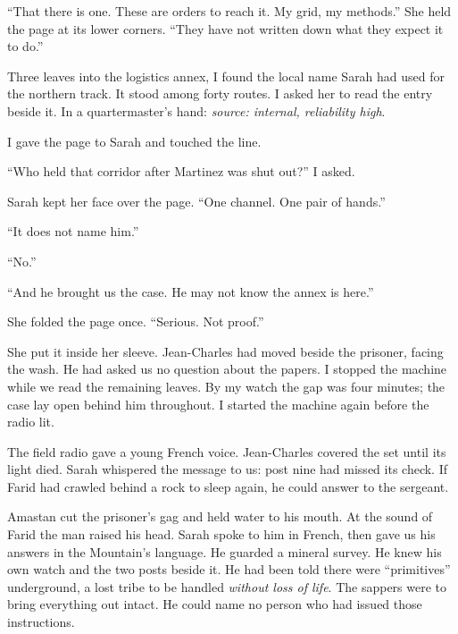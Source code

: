 ``That there is one. These are orders to reach it. My grid, my methods.'' She held the page at its lower corners. ``They have not written down what they expect it to do.''\par

Three leaves into the logistics annex, I found the local name Sarah had used for the northern track. It stood among forty routes. I asked her to read the entry beside it. In a quartermaster's hand: \emph{source: internal, reliability high}.\par

I gave the page to Sarah and touched the line.\par

``Who held that corridor after Martinez was shut out?'' I asked.\par

Sarah kept her face over the page. ``One channel. One pair of hands.''\par

``It does not name him.''\par

``No.''\par

``And he brought us the case. He may not know the annex is here.''\par

She folded the page once. ``Serious. Not proof.''\par

She put it inside her sleeve. Jean-Charles had moved beside the prisoner, facing the wash. He had asked us no question about the papers. I stopped the machine while we read the remaining leaves. By my watch the gap was four minutes; the case lay open behind him throughout. I started the machine again before the radio lit.\par

The field radio gave a young French voice. Jean-Charles covered the set until its light died. Sarah whispered the message to us: post nine had missed its check. If Farid had crawled behind a rock to sleep again, he could answer to the sergeant.\par

Amastan cut the prisoner's gag and held water to his mouth. At the sound of Farid the man raised his head. Sarah spoke to him in French, then gave us his answers in the Mountain's language. He guarded a mineral survey. He knew his own watch and the two posts beside it. He had been told there were ``primitives'' underground, a lost tribe to be handled \emph{without loss of life}. The sappers were to bring everything out intact. He could name no person who had issued those instructions.\par

